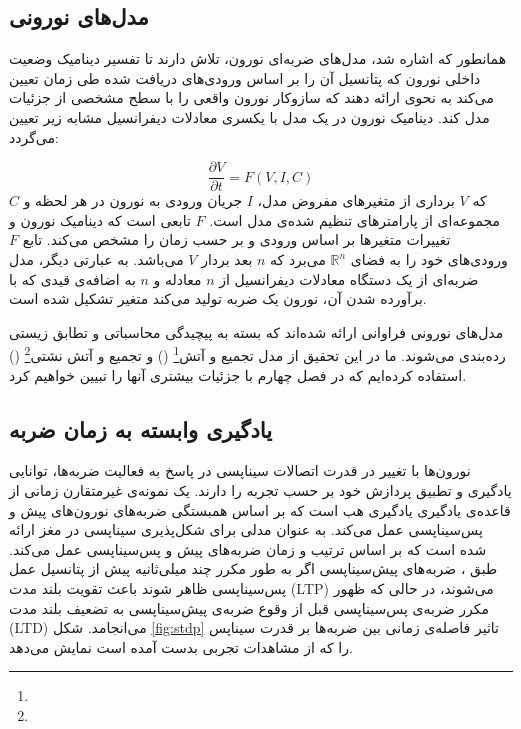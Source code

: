\subsection{مدل‌های نورونی}
همانطور که اشاره شد، مدل‌های ضربه‌ای نورون، تلاش دارند تا تفسیر دینامیک وضعیت داخلی نورون که پتانسیل آن را بر اساس ورودی‌های دریافت شده طی زمان تعیین می‌کند به نحوی ارائه دهند که سازوکار نورون واقعی را با سطح مشخصی از جزئیات مدل کند. دینامیک نورون در یک مدل با یکسری معادلات دیفرانسیل مشابه زیر تعیین می‌گردد:

\begin{equation} \label{eq:spiking}
\frac{\partial V}{\partial t} = F(V, I, C)
\end{equation}
که $V$ برداری از متغیرهای مفروض مدل، $I$ جریان ورودی به نورون در هر لحظه و $C$ مجموعه‌ای از پارامترهای تنظیم شده‌ی مدل است. $F$ تابعی است که دینامیک نورون و تغییرات متغیرها بر اساس ورودی و بر حسب زمان را مشخص می‌کند. تابع $F$ ورودی‌های خود را به فضای $\mathbb{R}^n$ می‌برد که $n$ بعد بردار $V$ می‌باشد. به عبارتی دیگر، مدل ضربه‌ای از یک دستگاه معادلات دیفرانسیل از $n$ معادله و $n$ به اضافه‌ی قیدی که با برآورده شدن آن، نورون یک ضربه تولید می‌کند متغیر تشکیل شده است.

مدل‌های نورونی فراوانی ارائه شده‌اند که بسته به پیچیدگی محاسباتی و تطابق زیستی رده‌بندی می‌شوند. ما در این تحقیق از مدل تجمیع و آتش\footnote{} () و تجمیع و آتش نشتی\footnote{} () استفاده کرده‌ایم که در فصل چهارم با جزئیات بیشتری آنها را تبیین خواهیم کرد. 

\subsection{یادگیری وابسته به زمان ضربه}
نورون‌ها با تغییر در قدرت اتصالات سیناپسی در پاسخ به فعالیت ضربه‌ها، توانایی یادگیری و تطبیق پردازش خود بر حسب تجربه را دارند. 
 یک نمونه‌ی غیرمتقارن زمانی از قاعده‌ی یادگیری یادگیری هب است که بر اساس همبستگی ضربه‌های نورون‌های پیش و پس‌سیناپسی عمل می‌کند.  به عنوان مدلی برای شکل‌پذیری سیناپسی در مغز ارائه شده است که بر اساس ترتیب و زمان ضربه‌های پیش و پس‌سیناپسی عمل می‌کند. طبق ، ضربه‌های پیش‌سیناپسی اگر به طور مکرر چند میلی‌ثانیه پیش از پتانسیل عمل پس‌سیناپسی ظاهر شوند باعث تقویت بلند مدت (LTP) می‌شوند، در حالی که ظهور مکرر ضربه‌ی پس‌سیناپسی قبل از وقوع ضربه‌ی پیش‌سیناپسی به تضعیف بلند مدت (LTD) می‌انجامد. شکل \ref{fig:stdp} تاثیر فاصله‌ی زمانی بین ضربه‌ها بر قدرت سیناپس را که از مشاهدات تجربی \cite{bi1998synaptic} بدست آمده است نمایش می‌دهد. 

